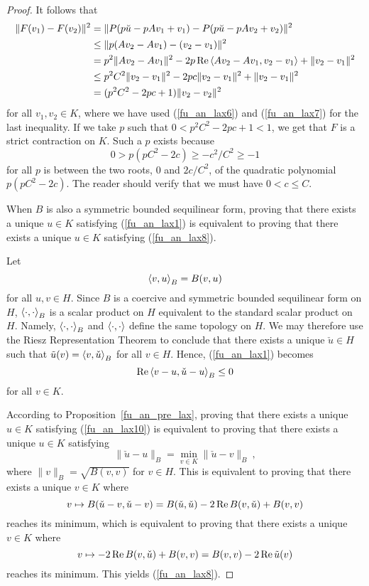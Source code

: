 \begin{proof}
It follows that
\begin{align*}
\| F(v_1) - F(v_2) \|^2 &= \| P(p\breve{u}-p Av_1 +v_1) -
P(p\breve{u}-p Av_2 +v_2) \|^2 \\
& \leq \| p (Av_2 - Av_1) - (v_2 - v_1) \|^2 \\
&= p^2 \| Av_2 - Av_1\|^2 -2p \operatorname{Re}\left\langle{Av_2 - Av_1} , {v_2 - v_1}\right\rangle
+ \|v_2 - v_1\|^2 \\
&\leq p^2 C^2 \| v_2-v_1 \|^2 - 2pc \|v_2-v_1\|^2 + \|v_2-v_1\|^2 \\
& = (p^2 C^2 - 2pc +1 ) \|v_2-v_2\|^2
\end{align*}
for all $v_1, v_2 \in K$, where we have used
(\ref{fu_an_lax6}) and (\ref{fu_an_lax7}) for the last
inequality.  If we take $p$ such that
$\displaystyle 0< p^2 C^2 - 2pc +1 <1$, we
get that $F$ is a strict contraction on $K$.  Such a $p$ exists
because
\[
0 > p(pC^2 -2c) \geq -c^2/C^2 \geq -1
\]
for all $p$ is between the two roots, $0$ and $\displaystyle 2c/C^2$, of the
quadratic polynomial $\displaystyle p(pC^2 -2c)$.  The reader should verify
that we must have $0<c\leq C$.

 When $B$ is also a symmetric bounded sequilinear form,
proving that there exists a unique $u\in K$ satisfying
(\ref{fu_an_lax1}) is equivalent to proving that there exists a unique
$u\in K$ satisfying (\ref{fu_an_lax8}).

Let
\[
\left\langle{v} , {u}\right\rangle_B = B(v,u) 
\]
for all $u,v \in H$.  Since $B$ is a coercive and symmetric bounded
sequilinear form on $H$, $\left\langle{\cdot} , {\cdot}\right\rangle_B$ is a scalar product on
$H$ equivalent to the standard scalar product on $H$.  Namely,
$\left\langle{\cdot} , {\cdot}\right\rangle_B$ and $\left\langle{\cdot} , {\cdot}\right\rangle$ define the same topology
on $H$.
We may therefore use the Riesz Representation Theorem to conclude
that there exists a unique $\check{u} \in H$ such that
$\displaystyle \tilde{u}(v) = \left\langle{v} , {\check{u}}\right\rangle_B$ for all $v \in H$.
Hence, (\ref{fu_an_lax1}) becomes
\begin{equation} \label{fu_an_lax10}
\operatorname{Re} \left\langle{v-u} , {\check{u}-u}\right\rangle_B \leq 0
\end{equation}
for all $v \in K$.

According to Proposition~\ref{fu_an_pre_lax}, proving that there exists
a unique $u\in K$ satisfying (\ref{fu_an_lax10}) is equivalent to
proving that there exists a unique $u\in K$ satisfying
\[
\| \check{u}-u\|_B = \min_{v\in K} \|\check{u}-v\|_B \ ,
\]
where $\|v\|_B = \sqrt{B(v,v)}$ for $v \in H$.  This is equivalent to
proving that there exists a unique $v \in K$ where
\[
v \mapsto B(\check{u}-v,\check{u}-v) = B(\check{u},\check{u})
-2 \operatorname{Re} B(v,\check{u}) + B(v,v)
\]
reaches its minimum, which is equivalent to proving that there exists
a unique $v \in K$ where
\[
v \mapsto  -2 \operatorname{Re} B(v,\check{u}) + B(v,v) = B(v,v) - 2 \operatorname{Re} \tilde{u}(v)
\]
reaches its minimum.  This yields (\ref{fu_an_lax8}).
\end{proof}


